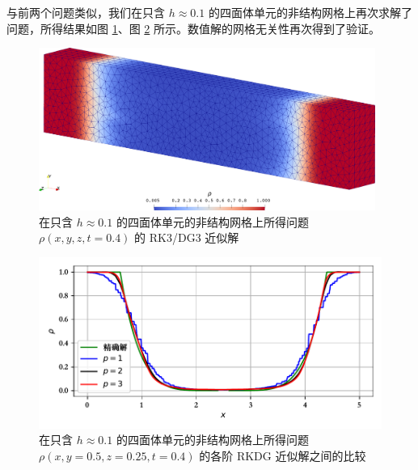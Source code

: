 与前两个问题类似，我们在只含 $h\approx0.1$ 的四面体单元的非结构网格上再次求解了问题，所得结果如图
\ref{fig:vacuum_tetra}、图 \ref{fig:vacuum_tetra_p_vary} 所示。数值解的网格无关性再次得到了验证。

\begin{figure}[h!]
\begin{centering}
\includegraphics[width=0.98\textwidth]{../mdpi/figures/shock_tubes/vacuum/contour_tetra}
\par\end{centering}
\caption{\label{fig:vacuum_tetra}在只含 $h\approx0.1$ 的四面体单元的非结构网格上所得问题
$\rho(x,y,z,t=0.4)$ 的 RK3/DG3 近似解}
\end{figure}

\begin{figure}[h!]
\begin{centering}
\includegraphics[width=1\textwidth,height=0.3\textheight,keepaspectratio]{figures/shock_tubes/vacuum/result_tetra}
\par\end{centering}
\caption{\label{fig:vacuum_tetra_p_vary}在只含 $h\approx0.1$ 的四面体单元的非结构网格上所得问题
$\rho(x,y=0.5,z=0.25,t=0.4)$ 的各阶 RKDG 近似解之间的比较}
\end{figure}


